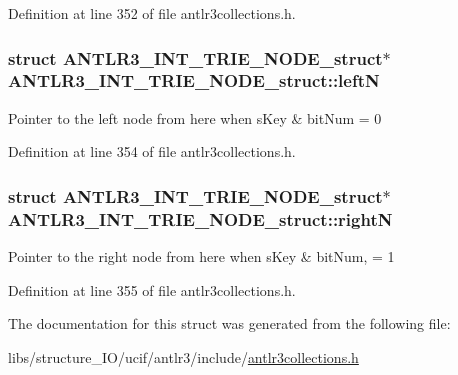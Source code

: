 Definition at line 352 of file antlr3collections.\-h.

\hypertarget{struct_a_n_t_l_r3___i_n_t___t_r_i_e___n_o_d_e__struct_aaf8b77d546946b2a5879e1a8d330955b}{
\subsubsection[{left\-N}]{\setlength{\rightskip}{0pt plus 5cm}struct {\bf A\-N\-T\-L\-R3\-\_\-\-I\-N\-T\-\_\-\-T\-R\-I\-E\-\_\-\-N\-O\-D\-E\-\_\-struct}$\ast$ A\-N\-T\-L\-R3\-\_\-\-I\-N\-T\-\_\-\-T\-R\-I\-E\-\_\-\-N\-O\-D\-E\-\_\-struct\-::left\-N}}\label{struct_a_n_t_l_r3___i_n_t___t_r_i_e___n_o_d_e__struct_aaf8b77d546946b2a5879e1a8d330955b}
Pointer to the left node from here when s\-Key \& bit\-Num = 0 

Definition at line 354 of file antlr3collections.\-h.

\hypertarget{struct_a_n_t_l_r3___i_n_t___t_r_i_e___n_o_d_e__struct_a1635fd0ed92e76ddd0a9983b34a445f5}{
\subsubsection[{right\-N}]{\setlength{\rightskip}{0pt plus 5cm}struct {\bf A\-N\-T\-L\-R3\-\_\-\-I\-N\-T\-\_\-\-T\-R\-I\-E\-\_\-\-N\-O\-D\-E\-\_\-struct}$\ast$ A\-N\-T\-L\-R3\-\_\-\-I\-N\-T\-\_\-\-T\-R\-I\-E\-\_\-\-N\-O\-D\-E\-\_\-struct\-::right\-N}}\label{struct_a_n_t_l_r3___i_n_t___t_r_i_e___n_o_d_e__struct_a1635fd0ed92e76ddd0a9983b34a445f5}
Pointer to the right node from here when s\-Key \& bit\-Num, = 1 

Definition at line 355 of file antlr3collections.\-h.



The documentation for this struct was generated from the following file\-:\begin{DoxyCompactItemize}
\item 
libs/structure\-\_\-\-I\-O/ucif/antlr3/include/\hyperlink{antlr3collections_8h}{antlr3collections.\-h}\end{DoxyCompactItemize}

